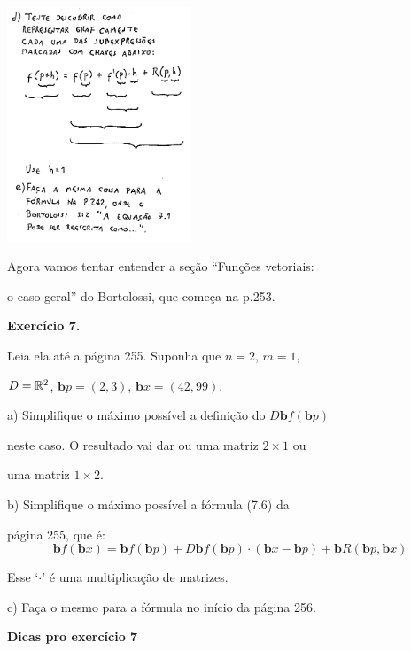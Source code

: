 \documentclass[oneside,12pt]{article}
\begin{document}
\includegraphics[height=7cm]{2020-2-C3/20210414_bortolossi_p240_d_e.pdf}

\newpage

Agora vamos tentar entender a seção ``Funções vetoriais:

o caso geral'' do Bortolossi, que começa na p.253.

\bsk


{\bf Exercício 7.}

Leia ela até a página 255. Suponha que $n=2$, $m=1$,

$D=\mathbb{R}^2$, $𝐛p=(2,3)$, $𝐛x=(42,99)$.

a) Simplifique o máximo possível a definição do $D𝐛f(𝐛p)$

neste caso. O resultado vai dar ou uma matriz $2×1$ ou

uma matriz $1×2$.

b) Simplifique o máximo possível a fórmula (7.6) da

página 255, que é:
%
$$𝐛f(𝐛x) = 𝐛f(𝐛p) + D𝐛f(𝐛p)·(𝐛x-𝐛p) + 𝐛R(𝐛p,𝐛x)$$

Esse `$·$' é uma multiplicação de matrizes.

c) Faça o mesmo para a fórmula no início da página 256.

\newpage


{\bf Dicas pro exercício 7}
\end{document}
